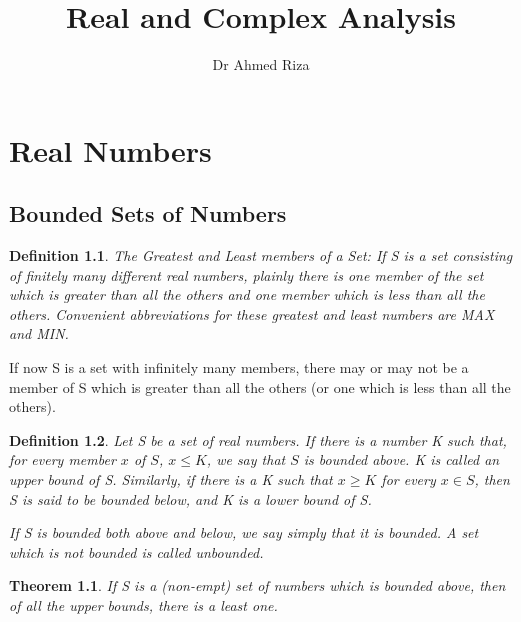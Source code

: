 \documentclass[12pt]{scrbook}
\newtheorem*{definition}{Definition}
\newtheorem{theorem}{Theorem}[section]
\begin{document}
\title{Real and Complex Analysis}
\author{Dr Ahmed Riza}
\date{}
\maketitle

\tableofcontents

\chapter{Real Numbers}

\section{Bounded Sets of Numbers}

\begin{definition}
The Greatest and Least members of a Set: If S is a set consisting of finitely many different real numbers, plainly there is one member of the set which is greater than all the others and one member which is less than all the others.  Convenient abbreviations for these greatest and least numbers are MAX and MIN.
\end{definition}

If now S is a set with infinitely many members, there may or may not be a member of S which is greater than all the others (or one which is less than all the others).

\begin{definition}
Let S be a set of real numbers.  If there is a number K such that, for every member $x$ of $S$, $ x \leq K$, we say that $S$ is bounded above. K is called an {\em upper bound} of S.  Similarly, if there is a K such that $x \ge K$ for every $x \in S$, then S is said to be bounded below, and K is a {\em lower bound} of S.

If S is bounded both above and below, we say simply that it is {\em bounded}. A set which is not bounded is called {\em unbounded}.
\end{definition}

\begin{theorem} %
\label{theorem-1.8}
If S is a (non-empt) set of numbers which is bounded above, then of all the upper bounds, there is a least one.
\end{theorem}
\end{document}
